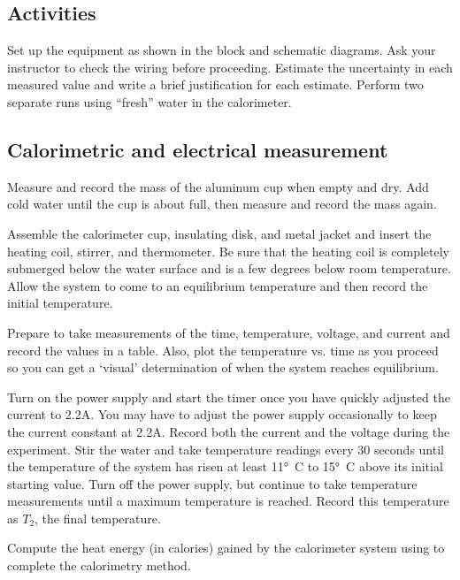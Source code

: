 \begin{multicols}{2}
\section{Activities}
Set up the equipment as shown in the block and schematic diagrams.  Ask your instructor to check the wiring before proceeding.  Estimate the uncertainty in each measured value and write a brief justification for each estimate. Perform two separate runs using ``fresh'' water in the calorimeter.

\subsection{Calorimetric and electrical measurement}

Measure and record the mass of the aluminum cup when empty and dry.
Add cold water until the cup is about  full, then measure and record the mass again.

Assemble the calorimeter cup, insulating disk, and metal jacket and insert the heating coil, stirrer, and thermometer.  Be sure that the heating coil is completely submerged below the water surface and is a few degrees below room temperature. Allow the system to come to an equilibrium temperature and then record the initial temperature.

Prepare to take measurements of the time, temperature, voltage, and current and record the values in a table. Also, plot the temperature vs. time as you proceed so you can get a `visual' determination of when the system reaches equilibrium.

Turn on the power supply and start the timer once you have quickly adjusted the current to 2.2A.  You may have to adjust the power supply occasionally to keep the current constant at 2.2A.  Record both the current and the voltage during the experiment.  Stir the water and take temperature readings every 30 seconds until the temperature of the system has risen at least \ang{11}~C to \ang{15}~C above its initial starting value.  Turn off the power supply, but continue to take temperature measurements %
until a maximum temperature is reached. Record this temperature as $T_2$, the final temperature.

Compute the heat energy (in calories) gained by the calorimeter system using  to complete the calorimetry method. %


\end{multicols}

